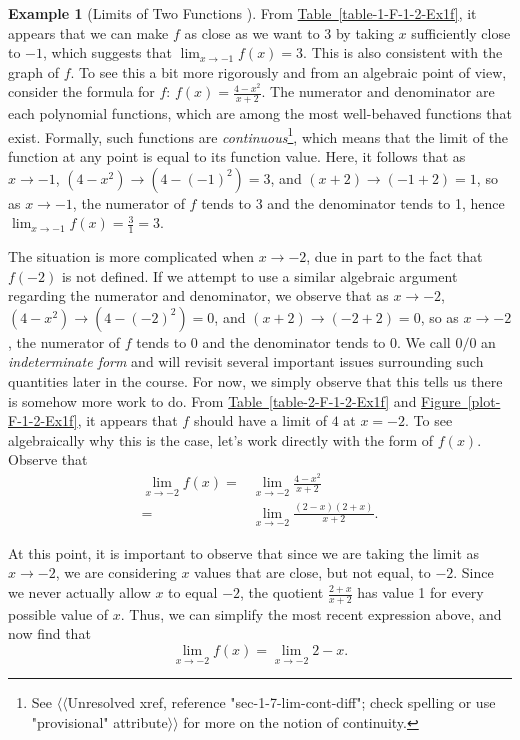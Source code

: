 \documentclass[10pt,]{book}
\theoremstyle{plain}
\theoremstyle{definition}
\theoremstyle{definition}
\theoremstyle{definition}
\newtheorem{example}[theorem]{Example}
\theoremstyle{definition}
\theoremstyle{definition}
\numberwithin{equation}{section}
\newcommand{\amp}{ & }
\begin{document}
\begin{example}[Limits of Two Functions
  ]
    From \hyperref[table-1-F-1-2-Ex1f]{Table~\ref{table-1-F-1-2-Ex1f}}, it appears that we can make \(f\) as close as we want to 3 by taking \(x\) sufficiently close to \(-1\), which suggests that \(\lim_{x \to -1} f(x) = 3\). This is also consistent with the graph of \(f\). To see this a bit more rigorously and from an algebraic point of view, consider the formula for \(f\): \(f(x) = \frac{4-x^2}{x+2}\). The numerator and denominator are each polynomial functions, which are among the most well-behaved functions that exist. Formally, such functions are \emph{continuous}\footnote{See {$\langle\langle$Unresolved xref, reference "sec-1-7-lim-cont-diff"; check spelling or use "provisional" attribute$\rangle\rangle$} for more on the notion of continuity.\label{fn-2}}, which means that the limit of the function at any point is equal to its function value. Here, it follows that as \(x \to -1\), \((4-x^2) \to (4 - (-1)^2) = 3\), and \((x+2) \to (-1 + 2) = 1\), so as \(x \to -1\), the numerator of \(f\) tends to 3 and the denominator tends to 1, hence \(\lim_{x \to -1} f(x) = \frac{3}{1} = 3\).
\par

    The situation is more complicated when \(x \to -2\), due in part to the fact that \(f(-2)\) is not defined. If we attempt to use a similar algebraic argument regarding the numerator and denominator, we observe that as \(x \to -2\), \((4-x^2) \to (4 - (-2)^2) = 0\), and \((x+2) \to (-2 + 2) = 0\), so as \(x \to -2\), the numerator of \(f\) tends to 0 and the denominator tends to 0. We call \(0/0\) an \emph{indeterminate form}\index{} and will revisit several important issues surrounding such quantities later in the course. For now, we simply observe that this tells us there is somehow more work to do. From \hyperref[table-2-F-1-2-Ex1f]{Table~\ref{table-2-F-1-2-Ex1f}} and \hyperref[plot-F-1-2-Ex1f]{Figure~\ref{plot-F-1-2-Ex1f}}, it appears that \(f\) should have a limit of \(4\) at \(x = -2\). To see algebraically why this is the case, let's work directly with the form of \(f(x)\). Observe that
\begin{align*}
\lim_{x \to -2} f(x) = \amp  \lim_{x \to -2} \frac{4-x^2}{x+2}\\
                     = \amp  \lim_{x \to -2} \frac{(2-x)(2+x)}{x+2}.
\end{align*}\par

    At this point, it is important to observe that since we are taking the limit as \(x \to -2\), we are considering \(x\) values that are close, but not equal, to \(-2\). Since we never actually allow \(x\) to equal \(-2\), the quotient \(\frac{2+x}{x+2}\) has value 1 for every possible value of \(x\). Thus, we can simplify the most recent expression above, and now find that
\begin{equation*}
    \lim_{x \to -2} f(x) = \lim_{x \to -2} 2-x.
    \end{equation*}\par


\end{example}
\end{document}
